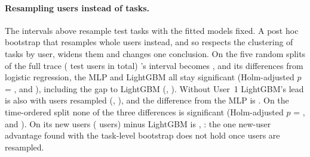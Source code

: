 \paragraph{Resampling users instead of tasks.} The intervals above resample test tasks with the fitted models fixed. A post hoc bootstrap that resamples whole users instead, and so respects the clustering of tasks by user, widens them and changes one conclusion. On the five random splits of the full trace ( test users in total) \kaam{}'s interval becomes , and its differences from logistic regression, the MLP and LightGBM all stay significant (Holm-adjusted $p$ = ,  and ), including the gap to LightGBM (, ). Without User~1 LightGBM's lead is also  with users resampled (, ), and the difference from the MLP is . On the time-ordered split none of the three differences is significant (Holm-adjusted $p$ = ,  and ). On its new users ( users) \kaam{} minus LightGBM is  , : the one new-user advantage found with the task-level bootstrap does not hold once users are resampled.



